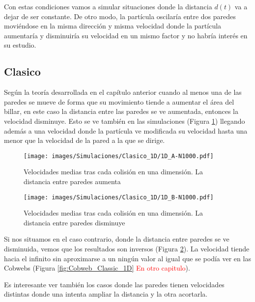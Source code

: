 \documentclass[11pt, spanish]{book}
\begin{document}
\vspace{3mm}

Con estas condiciones vamos a simular situaciones donde la distancia \( d(t) \) va a dejar de ser constante. De otro modo, la partícula oscilaría entre dos paredes moviéndose en la misma dirección y misma velocidad donde la partícula aumentaría y disminuiría su velocidad en un mismo factor y no habría interés en su estudio.

\subsection{Clasico}

Según la teoría desarrollada en el capítulo anterior cuando al menos una de las paredes se mueve de forma que su movimiento tiende a aumentar el área del billar, en este caso la distancia entre las paredes se ve aumentada, entonces la velocidad disminuye. Esto se ve también en las simulaciones (Figura \ref{fig:clasico_1D_A}) llegando además a una velocidad donde la partícula ve modificada su velocidad hasta una menor que la velocidad de la pared a la que se dirige.

\begin{figure}[H]
    \centering
    \texttt{[image: images/Simulaciones/Clasico\_1D/1D\_A-N1000.pdf]}
    \caption{Velocidades medias tras cada colisión en una dimensión. La distancia entre paredes aumenta}
    \label{fig:clasico_1D_A}
\end{figure}


\begin{figure}[H]
    \centering
    \texttt{[image: images/Simulaciones/Clasico\_1D/1D\_B-N1000.pdf]}
    \caption{Velocidades medias tras cada colisión en una dimensión. La distancia entre paredes disminuye}
    \label{fig:clasico_1D_B}
\end{figure}

Si nos situamos en el caso contrario, donde la distancia entre paredes se ve disminuida, vemos que los resultados son inversos (Figura \ref{fig:clasico_1D_B}). La velocidad tiende hacia el infinito sin aproximarse a un ningún valor al igual que se podía ver en las Cobwebs (Figura \ref{fig:Cobweb_Classic_1D} \textcolor{red}{En otro capitulo}). 

\vspace{3mm}

Es interesante ver también los casos donde las paredes tienen velocidades distintas donde una intenta ampliar la distancia y la otra acortarla. 
\end{document}
